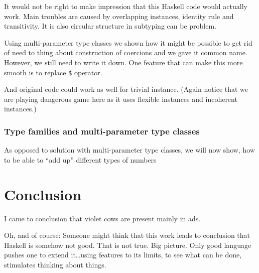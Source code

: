 \documentclass[11pt,oneside,draft]{fithesis2}
\newcommand\uv[1]{``#1''}
\theoremstyle{definition}
\begin{document}
It would not be right to make impression that this Haskell code
would actually work. Main troubles are caused by overlapping instances,
identity rule and transitivity. It is also circular structure in subtyping
can be problem.

Using multi-parameter type classes we shown how it might be possible to
get rid of need to thing about construction of coercions and we gave
it common name. However, we still need to write it down. One feature
that can make this more smooth is to replace \texttt{\$} operator.
\begin{comment}
$
\end{comment}
And original code could work as well for trivial instance.
(Again notice that we are playing dangerous game here as it uses
flexible instances and incoherent instances.)

\subsection{Type families and multi-parameter type classes}

As opposed to solution with multi-parameter type classes, we will
now show, how to be able to \uv{add up} different types of numbers

\cite{spjones:2009:funTypesFun}



\chapter{Conclusion}

I came to conclusion that violet cows are present mainly in ads.

Oh, and of course:
Someone might think that this work leads to conclusion that Haskell is somehow not good.
That is not true. Big picture. Only good language pushes one to extend it\dots using features
to its limits, to see what can be done, stimulates thinking about things.

\cite{GADT+Kind=Dep}

\clearpage
{}
{}
%


\end{document}
